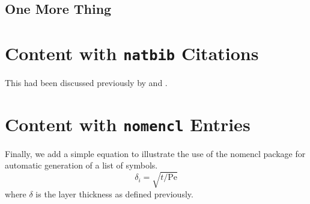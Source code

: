 \subsection{One More Thing}
\lipsum[22-25]

\section{Content with \texttt{natbib} Citations}

This had been discussed previously by \citep{bullwinkle.1990} and
\citet{winkle.1991}. \lipsum[22-25]


\section{Content with \texttt{nomencl} Entries}

Finally, we add a simple equation to illustrate the use of the nomencl
 package for automatic generation of a list of symbols.
\begin{equation}
\delta_i = \sqrt{t/\mathrm{Pe}}
\end{equation}
where $\delta$ is the layer
thickness %
%
%
%
as defined previously. \lipsum[26-30]

\endinput
